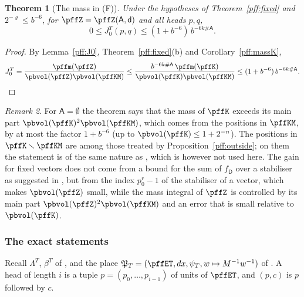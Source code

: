\documentclass[10pt]{amsart}
\newtheorem{theorem}{Theorem}[section]
\theoremstyle{definition}
\theoremstyle{remark}
\newtheorem{remark}[theorem]{Remark}
\begin{document}
\begin{theorem}[The mass in \textup{(F)}]\label{pff:mass}
Under the hypotheses of Theorem~\ref{pff:fixed} and $2^{-\varrho}\le b^{-6}$, for
$\pffZ=\pffZ(\mathsf A,\mathsf d)$ and all heads $p,q$,
\[
0\le J^T_0(p,q)\le(1+b^{-6})\,b^{-6k\#\mathsf A}.
\]
\end{theorem}
\begin{proof}
By Lemma~\ref{pff:J0}, Theorem~\ref{pff:fixed}(b) and Corollary~\ref{pff:massK},
\[
J^T_0=\frac{\pffm(\pffZ)}{\pbvol(\pffZ)\pbvol(\pffKM)}\le\frac{b^{-6k\#\mathsf A}\,\pffm(\pffK)}{
\pbvol(\pffK)\pbvol(\pffKM)}\le(1+b^{-6})\,b^{-6k\#\mathsf A}.\qedhere
\]
\end{proof}

\begin{remark}\label{pff:rem-E4}
For $\mathsf A=\emptyset$ the theorem says that the mass of $\pffK$ exceeds its main part
$\pbvol(\pffK)^2\pbvol(\pffKM)$, which comes from the positions in $\pffKM$, by at most the factor
$1+b^{-6}$ (up to $\pbvol(\pffK)\le1+2^{-n}$). The positions in $\pffK\smallsetminus\pffKM$ are among
those treated by Proposition~\ref{pff:outside}; on them the statement is of the same nature as
{\cite[Theorem~3.39]{P51}}, which is however not used here. The gain for fixed vectors does not come from
a bound for the sum of $f_{\mathsf D}$ over a stabiliser as suggested in {\cite[Remark~3.40(b)]{P51}},
but from the index $p_0^r-1$ of the stabiliser of a vector, which makes $\pbvol(\pffZ)$ small, while
the mass integral of $\pffZ$ is controlled by its main part $\pbvol(\pffZ)^2\pbvol(\pffKM)$ and an
error that is small relative to $\pbvol(\pffK)$.
\end{remark}

\subsubsection*{The exact statements}
Recall $\Lambda^T$, $\beta^T$ of {\cite[(38)]{P51}}, and the place $\mathfrak P_T=(\pffET,dx,\psi_T,
w\mapsto M^{-1}w^{-1})$ of {\cite[Theorem~3.50]{P51}}. A head of length $i$ is a tuple $p=(p_0,\dots,
p_{i-1})$ of units of $\pffET$, and $(p,c)$ is $p$ followed by $c$.
\end{document}
